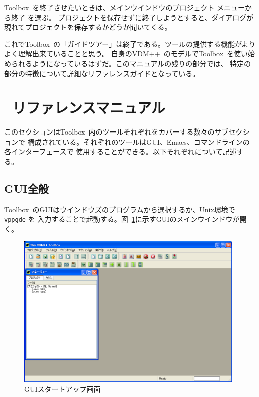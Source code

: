 \documentclass[\pformat,12pt]{jarticle}
\newcommand{\vdmslpp}{VDM++}
\newcommand{\Toolbox}{Toolbox}
\newcommand{\vdmgde}{vppgde}
\newcommand{\guicmd}[1]{{\gt #1}}
\begin{document}
\Toolbox\ を終了させたいときは、メインウインドウの\guicmd{プロジェクト} メニューから\guicmd{終了} を選ぶ。
プロジェクトを保存せずに終了しようとすると、ダイアログが現れてプロジェクトを保存するかどうか聞いてくる。

これで\Toolbox\ の「ガイドツアー」は終了である。ツールの提供する機能がよりよく理解出来ていることと思う。
自身の\vdmslpp\ のモデルで\Toolbox\ を使い始められるようになっているはずだ。このマニュアルの残りの部分では、
特定の部分の特徴について詳細なリファレンスガイドとなっている。

\newpage
\section{\protect\VDMTools\ リファレンスマニュアル}\label{sec:ref}


このセクションは\Toolbox\ 内のツールそれぞれをカバーする数々のサブセクションで
構成されている。それぞれのツールはGUI、Emacs、コマンドラインの各インターフェースで
使用することができる。以下それぞれについて記述する。

\subsection{GUI全般}\label{sec:GUI}


\Toolbox\ のGUIはウインドウズのプログラムから選択するか、Unix環境で{\tt \vdmgde} を
入力することで起動する。図~\ref{fig:startgui2}に示すGUIのメインウインドウが開く。

\begin{figure}[tbh]
\begin{center}
\includegraphics[width=11cm]{startgui-pp.png}
\caption{GUIスタートアップ画面}
\label{fig:startgui2}
\end{center}
\end{figure}
\end{document}
